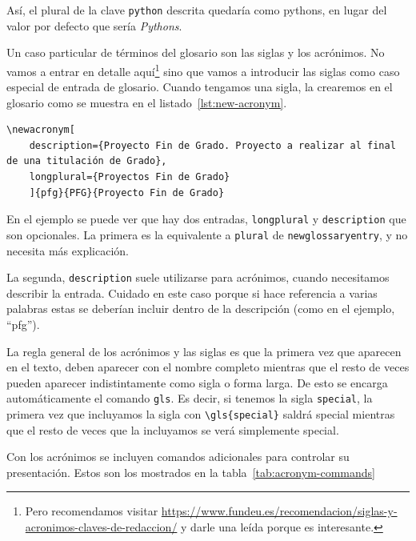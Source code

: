 \documentclass[%
    school=etsisi,%
    degree=61TI,%
]{upm-report}
\begin{document}
Así, el plural de la clave \texttt{python} descrita quedaría como \glspl{python}, en lugar del valor por defecto que sería \textit{Pythons}.

Un caso particular de términos del glosario son las siglas y los acrónimos. No vamos a entrar en detalle aquí\footnote{Pero recomendamos visitar \href{https://www.fundeu.es/recomendacion/siglas-y-acronimos-claves-de-redaccion/}{https://www.fundeu.es/recomendacion/siglas-y-acronimos-claves-de-redaccion/} y darle una leída porque es interesante.} sino que vamos a introducir las siglas como caso especial de entrada de glosario. Cuando tengamos una sigla, la crearemos en el glosario como se muestra en el listado~\ref{lst:new-acronym}.

\begin{lstlisting}[language={[latex]TeX},caption=Entrada genérica de una sigla o acrónimo en el glosario,label=lst:new-acronym]
\newacronym[
    description={Proyecto Fin de Grado. Proyecto a realizar al final de una titulación de Grado},
    longplural={Proyectos Fin de Grado}
    ]{pfg}{PFG}{Proyecto Fin de Grado}
\end{lstlisting}

En el ejemplo se puede ver que hay dos entradas, \texttt{longplural} y \texttt{description} que son opcionales. La primera es la equivalente a \texttt{plural} de \texttt{newglossaryentry}, y no necesita más explicación.

La segunda, \texttt{description} suele utilizarse para acrónimos, cuando necesitamos describir la entrada. Cuidado en este caso porque si hace referencia a varias palabras estas se deberían incluir dentro de la descripción (como en el ejemplo, \enquote{\acrlong{pfg}}).

La regla general de los acrónimos y las siglas es que la primera vez que aparecen en el texto, deben aparecer con el nombre completo mientras que el resto de veces pueden aparecer indistintamente como sigla o forma larga. De esto se encarga automáticamente el comando \texttt{gls}. Es decir, si tenemos la sigla \texttt{special}, la primera vez que incluyamos la sigla con \texttt{\textbackslash gls\{special\}} saldrá \gls{special} mientras que el resto de veces que la incluyamos se verá simplemente \gls{special}.

Con los acrónimos se incluyen comandos adicionales para controlar su presentación. Estos son los mostrados en la tabla~\ref{tab:acronym-commands}
\end{document}
